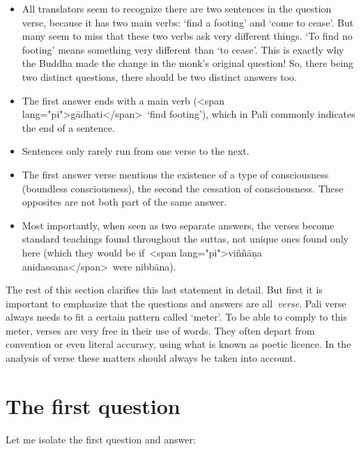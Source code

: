 \documentclass[10pt, openright]{book}
\begin{document}
\begin{itemize}

\itemsep5pt\parskip0pt


\item
All translators seem to recognize there are two sentences in the question verse, because it has two main verbs: ‘find a footing’ and ‘come to cease’. But many seem to miss that these two verbs ask very different things. ‘To find no footing’ means something very different than ‘to cease’. This is exactly why the Buddha made the change in the monk’s original question! So, there being two distinct questions, there should be two distinct answers too.



\item
The first answer ends with a main verb (<span lang="pi">gādhati</span> ‘find footing’), which in Pali commonly indicates the end of a sentence.



\item
Sentences only rarely run from one verse to the next.



\item
The first answer verse mentions the existence of a type of consciousness (boundless consciousness), the second the cessation of consciousness. These opposites are not both part of the same answer.



\item
Most importantly, when seen as two separate answers, the verses become standard teachings found throughout the suttas, not unique ones found only here (which they would be if <span lang="pi">viññāṇa anidassana</span> were nibbāna).





\end{itemize}
The rest of this section clarifies this last statement in detail. But first it is important to emphasize that the questions and answers are all \textit{verse}. Pali verse always needs to fit a certain pattern called ‘meter’. To be able to comply to this meter, verses are very free in their use of words. They often depart from convention or even literal accuracy, using what is known as poetic licence. In the analysis of verse these matters should always be taken into account.




\section{The first question}
Let me isolate the first question and answer:
\end{document}
